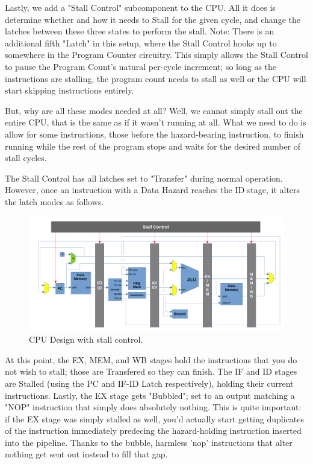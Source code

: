 \documentclass[12pt,twoside]{reedthesis}
\begin{document}
Lastly, we add a "Stall Control" subcomponent to the CPU. All it does is determine whether and how it needs to Stall for the given cycle, and  change the latches between these three states to perform the stall. Note: There is an additional fifth "Latch" in this setup, where the Stall Control hooks up to somewhere in the Program Counter circuitry. This simply allows the Stall Control to pause the Program Count's natural per-cycle increment; so long as the instructions are stalling, the program count needs to stall as well or the CPU will start skipping instructions entirely.

But, why are all these modes needed at all? Well, we cannot simply stall out the entire CPU, that is the same as if it wasn't running at all. What we need to do is allow for some instructions, those before the hazard-bearing instruction, to finish running while the rest of the program stops and waits for the desired number of stall cycles.

The Stall Control has all latches set to "Transfer" during normal operation. However, once an instruction with a Data Hazard reaches the ID stage, it alters the latch modes as follows.

\begin{figure}[h!]

	\centering
	\includegraphics[scale=0.45]{cpu_stallctl}
	\caption{CPU Design with stall control.}
	\label{stall-ctl}
\end{figure}

At this point, the EX, MEM, and WB stages hold the instructions that you do not wish to stall; those are Transfered so they can finish. The IF and ID stages are Stalled (using the PC and IF-ID Latch respectively), holding their current instructions. Lastly, the EX stage gets "Bubbled"; set to an output matching a "NOP" instruction that simply does absolutely nothing. This is quite important: if the EX stage was simply stalled as well, you'd actually start getting duplicates of the instruction immediately predecing the hazard-holding instruction inserted into the pipeline. Thanks to the bubble, harmless 'nop' instructions that alter nothing get sent out instead to fill that gap.
\end{document}
